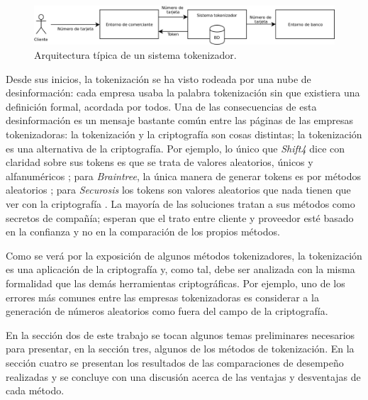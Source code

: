 \begin{figure}
  \centering
  \includegraphics[width=0.8\linewidth]
    {algoritmos_tokenizadores/diagramas/sistema_tokenizador.png}
  \caption{Arquitectura típica de un sistema tokenizador.}
  \label{figura:arquitectura_tokenizacion}
\end{figure}


Desde sus inicios, la tokenización se ha visto rodeada por una nube de
desinformación: cada empresa usaba la palabra tokenización sin que existiera una
definición formal, acordada por todos. Una de las consecuencias de esta
desinformación es un mensaje bastante común entre las páginas de las empresas
tokenizadoras: la tokenización y la criptografía son cosas distintas; la
tokenización es una alternativa de la criptografía. Por ejemplo, lo único que
\textit{Shift4} dice con claridad sobre sus tokens es que se trata de valores
aleatorios, únicos y alfanuméricos \cite{shif4_uno}; para
\textit{Braintree}, la única manera de generar tokens es por métodos aleatorios
\cite{braintree_uno}; para \textit{Securosis} los tokens son valores aleatorios
que nada tienen que ver con la criptografía \cite{securosis}. La mayoría de las
soluciones tratan a sus métodos como secretos de compañía; esperan que el trato
entre cliente y proveedor esté basado en la confianza y no en la comparación de
los propios métodos.


Como se verá por la exposición de algunos métodos tokenizadores, la tokenización
es una aplicación de la criptografía y, como tal, debe ser analizada con la
misma formalidad que las demás herramientas criptográficas. Por ejemplo, uno de
los errores más comunes entre las empresas tokenizadoras es considerar a la
generación de números aleatorios como fuera del campo de la criptografía.


En la sección dos de este trabajo se tocan algunos temas preliminares necesarios
para presentar, en la sección tres, algunos de los métodos de tokenización. En la
sección cuatro se presentan los resultados de las comparaciones de desempeño
realizadas y se concluye con una discusión acerca de las ventajas y desventajas
de cada método.
